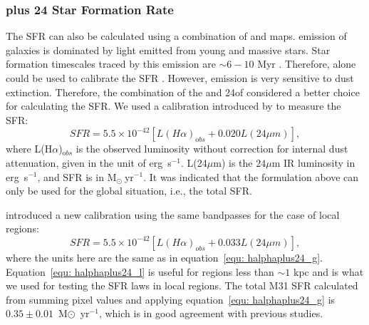 \subsubsection{\halpha plus 24 \um Star Formation Rate}
\label{sec:sfr_halpha}

The SFR can also be calculated using a combination of \halpha and  \um maps. \halpha emission of galaxies is dominated by light emitted from young and massive stars. Star formation timescales traced by this emission are $\sim 6-10$ Myr \citep[e.g.][]{Kennicutt09, Calzetti13}. Therefore, \halpha alone could be used to calibrate the SFR \citep[e.g.][]{Osterbrock06, Kennicutt09}. However, \halpha emission is very sensitive to dust extinction. Therefore, the combination of the \halpha and 24\um of considered a better choice for calculating the SFR. We used a calibration introduced by \citet{Kennicutt09} to measure the SFR:
\begin{equation}
\label{equ: halphaplus24_g}
SFR = 5.5 \times 10^{-42}[L(H{\alpha})_{\mathrm obs} + 0.020L(24\mu m)],
\end{equation}
\noindent where L(H${\alpha}$)$_{\mathrm obs}$ is the observed \halpha luminosity without correction for internal dust attenuation, given in the unit of erg~s$^{-1}$. L(24$\mu$m) is the $24\mu$m IR luminosity in erg~s$^{-1}$, and SFR is in M$_{\odot}~$yr$^{-1}$. It was indicated that the formulation above can only be used for the global situation, i.e., the total SFR.

\citet{Calzetti07} introduced a new calibration using the same bandpasses for the case of local regions:
\begin{equation}
\label{equ: halphaplus24_l}
SFR = 5.5 \times 10^{-42}[L(H{\alpha})_{obs} + 0.033L(24\mu m)],
\end{equation}
\noindent where the units here are the same as in equation~\ref{equ: halphaplus24_g}. Equation~\ref{equ: halphaplus24_l} is useful for regions less than $\sim 1$ kpc and is what we used for testing the SFR laws in local regions. The total M31 SFR calculated from summing pixel values and applying equation~\ref{equ: halphaplus24_g} is $0.35 \pm 0.01$~M$\odot$~yr$^{-1}$, which is in good agreement with previous studies.

